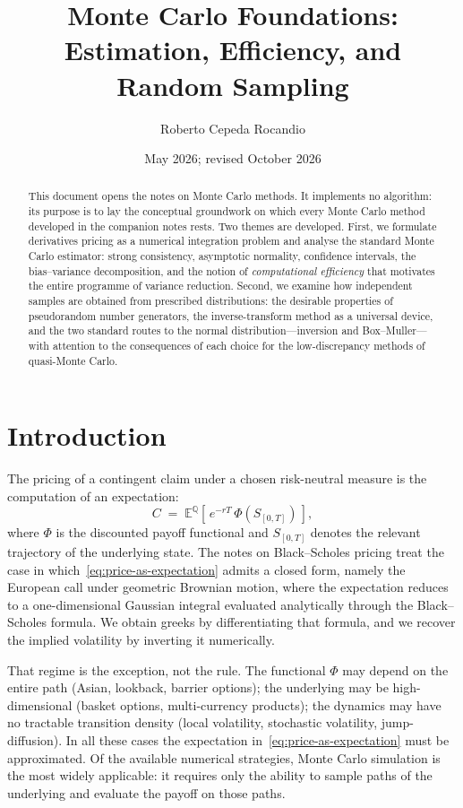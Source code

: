 \documentclass[11pt,a4paper]{article}
\title{Monte Carlo Foundations:\\
       Estimation, Efficiency, and Random Sampling}
\author{Roberto Cepeda Rocandio}
\date{May 2026; revised October 2026}
\theoremstyle{plain}
\theoremstyle{definition}
\theoremstyle{remark}
\newcommand{\E}{\mathbb{E}}
\newcommand{\Q}{\mathbb{Q}}
\begin{document}
\maketitle

\begin{abstract}
This document opens the notes on Monte Carlo methods. It implements no
algorithm:
its purpose is to lay the conceptual groundwork on which every Monte Carlo
method developed in the companion notes rests. Two themes are
developed. First, we formulate derivatives pricing as a numerical
integration problem and analyse the standard Monte Carlo estimator:
strong consistency, asymptotic normality, confidence intervals, the
bias--variance decomposition, and the notion of \emph{computational
efficiency} that motivates the entire programme of variance reduction.
Second, we examine how independent samples are obtained from prescribed
distributions: the desirable properties of pseudorandom number
generators, the inverse-transform method as a universal device, and the
two standard routes to the normal distribution---inversion and
Box--Muller---with attention to the consequences of each choice for the
low-discrepancy methods of quasi-Monte Carlo.
\end{abstract}

\tableofcontents

\section{Introduction}
\label{sec:intro}

The pricing of a contingent claim under a chosen risk-neutral measure is
the computation of an expectation:
\begin{equation}
\label{eq:price-as-expectation}
C \;=\; \E^{\Q}\!\left[\, e^{-rT}\,\Phi(S_{[0,T]}) \,\right],
\end{equation}
where $\Phi$ is the discounted payoff functional and $S_{[0,T]}$ denotes
the relevant trajectory of the underlying state. The notes on
Black--Scholes pricing treat
the case in which~\eqref{eq:price-as-expectation} admits a closed form,
namely the European call under geometric Brownian motion, where the
expectation reduces to a one-dimensional Gaussian integral evaluated
analytically through the Black--Scholes formula. We obtain greeks by
differentiating that formula, and we recover the implied volatility by
inverting it numerically.

That regime is the exception, not the rule. The functional $\Phi$ may
depend on the entire path (Asian, lookback, barrier options); the
underlying may be high-dimensional (basket options, multi-currency
products); the dynamics may have no tractable transition density (local
volatility, stochastic volatility, jump-diffusion). In all these cases
the expectation in~\eqref{eq:price-as-expectation} must be approximated.
Of the available numerical strategies, Monte Carlo simulation is the
most widely applicable: it requires only the ability to sample paths of
the underlying and evaluate the payoff on those paths.
\end{document}
